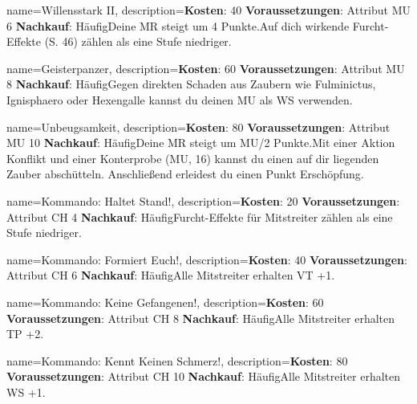 {
    name={Willensstark II},
    description={\textbf{Kosten}: 40 \textbf{Voraussetzungen}: Attribut MU 6 \textbf{Nachkauf}: Häufig\newline Deine MR steigt um 4 Punkte.\newline Auf dich wirkende Furcht-Effekte (S. 46) zählen als eine Stufe niedriger.}
}


{
    name={Geisterpanzer},
    description={\textbf{Kosten}: 60 \textbf{Voraussetzungen}: Attribut MU 8 \textbf{Nachkauf}: Häufig\newline Gegen direkten Schaden aus Zaubern wie Fulminictus, Ignisphaero oder Hexengalle kannst du deinen MU als WS verwenden.}
}


{
    name={Unbeugsamkeit},
    description={\textbf{Kosten}: 80 \textbf{Voraussetzungen}: Attribut MU 10 \textbf{Nachkauf}: Häufig\newline Deine MR steigt um MU/2 Punkte.\newline Mit einer Aktion Konflikt und einer Konterprobe (MU, 16) kannst du einen auf dir liegenden Zauber abschütteln. Anschließend erleidest du einen Punkt Erschöpfung.}
}


{
    name={Kommando: Haltet Stand!},
    description={\textbf{Kosten}: 20 \textbf{Voraussetzungen}: Attribut CH 4 \textbf{Nachkauf}: Häufig\newline Furcht-Effekte für Mitstreiter zählen als eine Stufe niedriger.}
}


{
    name={Kommando: Formiert Euch!},
    description={\textbf{Kosten}: 40 \textbf{Voraussetzungen}: Attribut CH 6 \textbf{Nachkauf}: Häufig\newline Alle Mitstreiter erhalten VT +1.}
}


{
    name={Kommando: Keine Gefangenen!},
    description={\textbf{Kosten}: 60 \textbf{Voraussetzungen}: Attribut CH 8 \textbf{Nachkauf}: Häufig\newline Alle Mitstreiter erhalten TP +2.}
}


{
    name={Kommando: Kennt Keinen Schmerz!},
    description={\textbf{Kosten}: 80 \textbf{Voraussetzungen}: Attribut CH 10 \textbf{Nachkauf}: Häufig\newline Alle Mitstreiter erhalten WS +1.}
}


